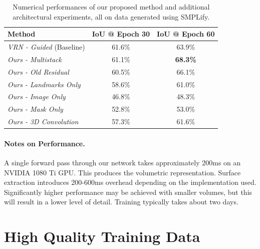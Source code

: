 \begin{table}
  \caption{Numerical performances of our proposed method and additional
  architectural experiments, all on data generated using SMPLify.}
  \label{tab:results}
  \centering
  \begin{tabular}{|l||c|c|}
    \hline
    \textbf{Method} & \textbf{IoU @ Epoch 30}  & \textbf{IoU @ Epoch 60} \\
    \hline\hline
    \textit{VRN - Guided}  (Baseline)  & 61.6\% & 63.9\% \\
    \hline
    \textit{Ours - Multistack}         & 61.1\% & \textbf{68.3\%} \\
    \textit{Ours - Old Residual}       & 60.5\% & 66.1\% \\
    \hline
    \textit{Ours - Landmarks Only}     & 58.6\% & 61.0\%  \\
    \textit{Ours - Image Only}         & 46.8\% & 48.3\% \\
    \textit{Ours - Mask Only}          & 52.8\% & 53.0\%\\
    \hline
    \textit{Ours - 3D Convolution}     & 57.3\% & 61.6\%\\

    \hline
\end{tabular}
\end{table}

\paragraph{Notes on Performance.} A single forward pass through our
network takes approximately 200ms on an NVIDIA 1080 Ti GPU. This
produces the volumetric representation. Surface extraction introduces
200-600ms overhead depending on the implementation used. Significantly
higher performance may be achieved with smaller volumes, but this will
result in a lower level of detail. Training typically takes about two
days.




\section{High Quality Training Data}
\label{sec:detailed}

